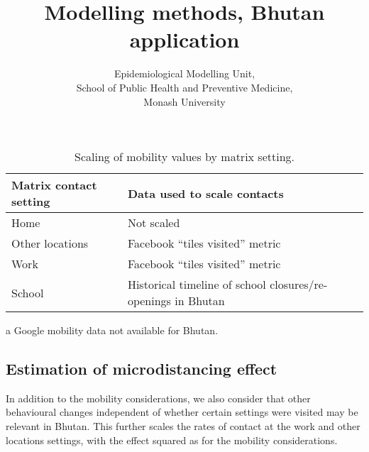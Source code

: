 \documentclass{article}
\author{
    Epidemiological Modelling Unit,
    \\ School of Public Health and Preventive Medicine,
    \\ Monash University
}
\title{Modelling methods, Bhutan application}
\begin{document}
\maketitle
\tableofcontents
\newpage










\begin{table}
    \begin{threeparttable}
    \begin{tabularx}{\textwidth}{| X | X |}
        \hline
        Matrix contact setting & Data used to scale contacts \\
        \hline
        Home & Not scaled \\
        \hline
        Other locations & Facebook ``tiles visited'' metric \tnote{a} \\
        \hline
        Work & Facebook ``tiles visited'' metric \tnote{a} \\
        \hline
        School & Historical timeline of school closures/re-openings in Bhutan \\
        \hline
	\end{tabularx}
	\caption{Scaling of mobility values by matrix setting.}
	\label{tab:location_scaling}
    \begin{tablenotes}
        \item[a] Google mobility data not available for Bhutan.
    \end{tablenotes}
    \end{threeparttable}
\end{table}

\subsection{Estimation of microdistancing effect}
In addition to the mobility considerations, we also consider that other
behavioural changes independent of whether certain settings were visited
may be relevant in Bhutan.
This further scales the rates of contact at the work and other locations settings,
with the effect squared as for the mobility considerations.
\end{document}
